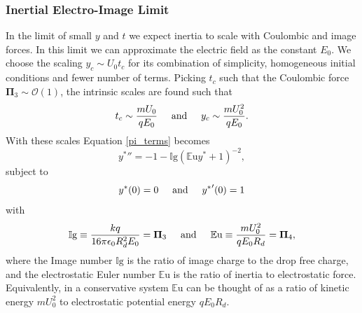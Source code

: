 \documentclass[aip,reprint, floatfix]{revtex4-1}
\begin{document}
\subsubsection{Inertial Electro-Image Limit}
In the limit of small $y$ and $t$ we expect inertia to scale with Coulombic and image forces. In this limit we can approximate the electric field as the constant $E_0$. We choose the scaling $y_c \sim U_0 t_c$ for its combination of simplicity, homogeneous initial conditions and fewer number of terms. Picking $t_c$ such that the Coulombic force $\mathbf{\Pi}_3 \sim \mathcal{O}(1)$, the intrinsic scales are found such that
\[ t_c \sim \frac{m U_0}{q E_0} \hspace{5 mm} \mbox{and} \hspace{5 mm} 
y_c \sim \frac{m U_0^2}{q E_0} .
\]
With these scales Equation \ref{pi_terms} becomes
\begin{equation}
{y^*}'' = -1 - \mathbb{I}\mbox{g} \left( \mathbb{E}\mbox{u}{y^*} + 1 \right)^{-2} , \label{img_limit}
\end{equation}
subject to
\begin{equation*}
{y^*}(0) = 0 \hspace{5 mm} \mbox{and} \hspace{5 mm} {y^*}'(0) = 1
\end{equation*}
with 
\[ \mathbb{I}\mbox{g} \equiv \frac{k q}{16 \pi \epsilon_0 R_d^2 E_0} = \mathbf{\Pi}_3  \hspace{5 mm} \mbox{and} \hspace{5 mm}
\mathbb{E}\mbox{u} \equiv \frac{m U_0^2}{q E_0 R_d} = \mathbf{\Pi}_4 ,
\]
where the Image number $\mathbb{I}\mbox{g}$ is the ratio of image charge to the drop free charge, and the electrostatic Euler number $\mathbb{E}\mbox{u}$ is the ratio of inertia to electrostatic force. Equivalently, in a conservative system $\mathbb{E}\mbox{u}$ can be thought of as a ratio of kinetic energy $m U_0^2$ to electrostatic potential energy $q E_0 R_d$.
\end{document}

